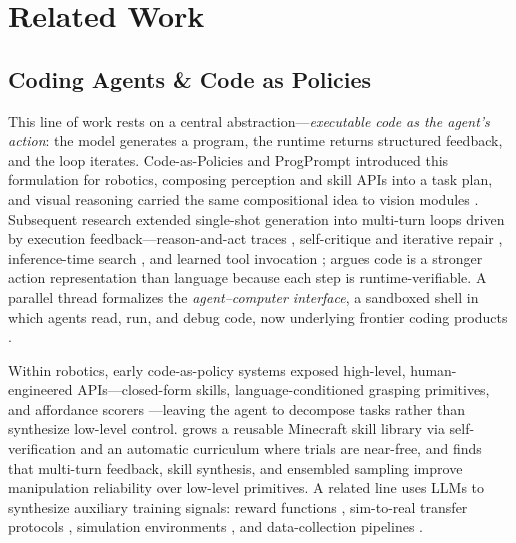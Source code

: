 




\section{Related Work}\label{sec:related}
\subsection{Coding Agents \& Code as Policies}
\label{sec:related-coding}
This line of work rests on a central abstraction---\emph{executable code as the agent's action}: the model generates a program, the runtime returns structured feedback, and the loop iterates. Code-as-Policies \citep{cap} and ProgPrompt \citep{singh2022progprompt} introduced this formulation for robotics, composing perception and skill APIs into a task plan, and visual reasoning carried the same compositional idea to vision modules \citep{suris2023vipergpt}. Subsequent research extended single-shot generation into multi-turn loops driven by execution feedback---reason-and-act traces \citep{yao2022react}, self-critique and iterative repair \citep{shinn2023reflexion, madaan2023self}, inference-time search \citep{yao2023tree}, and learned tool invocation \citep{schick2023toolformer}; \citet{wang2024codeact} argues code is a stronger action representation than language because each step is runtime-verifiable. A parallel thread formalizes the \emph{agent--computer interface}, a sandboxed shell in which agents read, run, and debug code, now underlying frontier coding products \citep{openai2026codex, anthropic2026claudeopus47, moonshot2026kimicode}.

Within robotics, early code-as-policy systems exposed high-level, human-engineered APIs---closed-form skills, language-conditioned grasping primitives, and affordance scorers \citep{saycan}---leaving the agent to decompose tasks rather than synthesize low-level control. \citet{wang2023voyager} grows a reusable Minecraft skill library via self-verification and an automatic curriculum where trials are near-free, and \citet{capx2026} finds that multi-turn feedback, skill synthesis, and ensembled sampling improve manipulation reliability over low-level primitives. A related line uses LLMs to synthesize auxiliary training signals: reward functions \citep{ma2024eureka, xie2024text2reward, yu2023language}, sim-to-real transfer protocols \citep{ma2024dreureka}, simulation environments \citep{wang2023robogen}, and data-collection pipelines \citep{ahn2024autort}.

